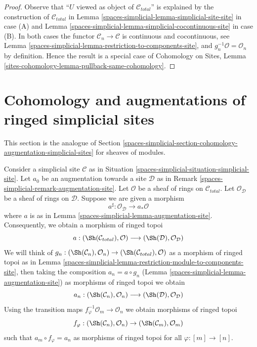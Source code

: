 \begin{proof}
Observe that ``$U$ viewed as object of $\mathcal{C}_{total}$''
is explained by the construction of $\mathcal{C}_{total}$ in
Lemma \ref{spaces-simplicial-lemma-simplicial-site-site} in case (A) and
Lemma \ref{spaces-simplicial-lemma-simplicial-cocontinuous-site} in case (B).
In both cases the functor $\mathcal{C}_n \to \mathcal{C}$
is continuous and cocontinuous, see
Lemma \ref{spaces-simplicial-lemma-restriction-to-components-site}, and
$g_n^{-1}\mathcal{O} = \mathcal{O}_n$ by definition.
Hence the result is a special case of
Cohomology on Sites, Lemma
\ref{sites-cohomology-lemma-pullback-same-cohomology}.
\end{proof}

\section{Cohomology and augmentations of ringed simplicial sites}
\label{spaces-simplicial-section-cohomology-augmentation-ringed-simplicial-sites}
This section is the analogue of
Section \ref{spaces-simplicial-section-cohomology-augmentation-simplicial-sites}
for sheaves of modules.

\medskip\noindent
Consider a simplicial site $\mathcal{C}$ as in
Situation \ref{spaces-simplicial-situation-simplicial-site}.
Let $a_0$ be an augmentation towards a site $\mathcal{D}$ as in
Remark \ref{spaces-simplicial-remark-augmentation-site}.
Let $\mathcal{O}$ be a sheaf of rings on $\mathcal{C}_{total}$.
Let $\mathcal{O}_\mathcal{D}$ be a sheaf of rings on $\mathcal{D}$.
Suppose we are given a morphism
$$
a^\sharp : \mathcal{O}_\mathcal{D} \longrightarrow a_*\mathcal{O}
$$
where $a$ is as in Lemma \ref{spaces-simplicial-lemma-augmentation-site}.
Consequently, we obtain a morphism of ringed topoi
$$
a :
(\Sh(\mathcal{C}_{total}), \mathcal{O})
\longrightarrow
(\Sh(\mathcal{D}), \mathcal{O}_\mathcal{D})
$$
We will think of $g_n : (\Sh(\mathcal{C}_n), \mathcal{O}_n) \to
(\Sh(\mathcal{C}_{total}), \mathcal{O})$ as a morphism of ringed topoi
as in
Lemma \ref{spaces-simplicial-lemma-restriction-module-to-components-site}, then
taking the composition $a_n = a \circ g_n$
(Lemma \ref{spaces-simplicial-lemma-augmentation-site})
as morphisms of ringed topoi we obtain
$$
a_n :
(\Sh(\mathcal{C}_n), \mathcal{O}_n)
\longrightarrow
(\Sh(\mathcal{D}), \mathcal{O}_\mathcal{D})
$$
Using the transition maps $f_\varphi^{-1}\mathcal{O}_m \to \mathcal{O}_n$
we obtain morphisms of ringed topoi
$$
f_\varphi : (\Sh(\mathcal{C}_n), \mathcal{O}_n) \to
(\Sh(\mathcal{C}_m), \mathcal{O}_m)
$$
such that $a_m \circ f_\varphi = a_n$ as morphisms of
ringed topoi for all $\varphi : [m] \to [n]$.

